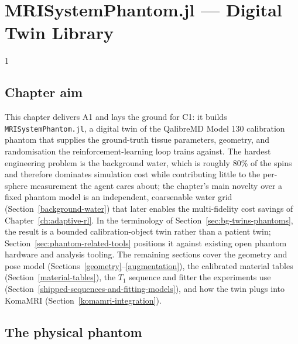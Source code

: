 \hypertarget{mrisystemphantom.jl-digital-twin-library}{%
\chapter{MRISystemPhantom.jl --- Digital Twin
Library}\label{ch:mri-system-phantom}}

\begin{spacing}{1} %
\minitoc %
\end{spacing} %
\thesisspacing %

\setlength{\textfloatsep}{10pt plus 2pt minus 2pt}
\setlength{\floatsep}{8pt plus 2pt minus 2pt}
\setlength{\intextsep}{8pt plus 2pt minus 2pt}
\setlength{\abovecaptionskip}{4pt}
\setlength{\belowcaptionskip}{0pt}

\section{Chapter aim}
\label{sec:twin-aim}

This chapter delivers A1 and lays the ground for C1: it builds
\texttt{MRISystemPhantom.jl}, a digital twin of the QalibreMD Model 130
calibration phantom that supplies the ground-truth tissue parameters,
geometry, and randomisation the reinforcement-learning loop trains against.
The hardest engineering problem is the background water, which is roughly
80\% of the spins and therefore dominates simulation cost while contributing
little to the per-sphere measurement the agent cares about; the chapter's
main novelty over a fixed phantom model is an independent, coarsenable water
grid (Section~\ref{background-water}) that later enables the multi-fidelity
cost savings of Chapter~\ref{ch:adaptive-rl}. In the terminology of
Section~\ref{sec:bg-twins-phantoms}, the result is a bounded
calibration-object twin rather than a patient twin;
Section~\ref{sec:phantom-related-tools} positions it against existing open
phantom hardware and analysis tooling. The remaining sections cover
the geometry and pose model (Sections~\ref{geometry}--\ref{augmentation}),
the calibrated material tables (Section~\ref{material-tables}), the
$T_1$ sequence and fitter the experiments use
(Section~\ref{shipped-sequences-and-fitting-models}), and how the twin plugs
into KomaMRI (Section~\ref{komamri-integration}).

\hypertarget{the-physical-phantom}{%
\section{The physical phantom}\label{the-physical-phantom}}

